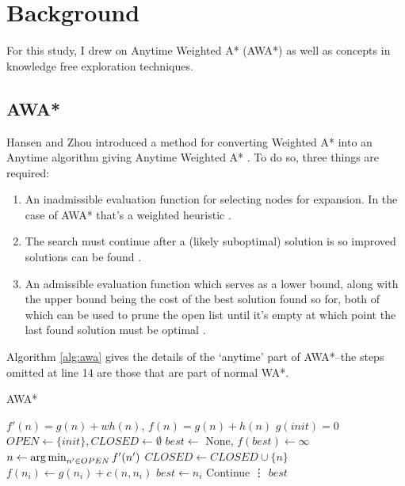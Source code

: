 \section{Background}
For this study, I drew on Anytime Weighted A* (AWA*) as well as concepts in knowledge free exploration techniques.

\subsection{AWA*}
Hansen and Zhou introduced a method for converting Weighted A* into an Anytime algorithm giving Anytime Weighted A* \cite{hansen2007anytime}. To do so, three things are required:

\begin{enumerate}
    \item An inadmissible evaluation function for selecting nodes for expansion. In the case of AWA* that's a weighted heuristic \cite{hansen2007anytime}.
    \item The search must continue after a (likely suboptimal) solution is so improved solutions can be found \cite{hansen2007anytime}.
    \item An admissible evaluation function which serves as a lower bound, along with the upper bound being the cost of the best solution found so for, both of which can be used to prune the open list until it's empty at which point the last found solution must be optimal \cite{hansen2007anytime}.
\end{enumerate}

Algorithm \ref{alg:awa} gives the details of the `anytime' part of AWA*--the steps omitted at line 14 are those that are part of normal WA*.

\begin{algorithm}
\caption{AWA*}\label{alg:awa}
\begin{algorithmic}[1]
\Require $f'(n)=g(n)+wh(n)$, $f(n)=g(n)+h(n)$
\State $g(init) = 0$
\State $OPEN \gets \{init\}, CLOSED \gets \emptyset$
\State $best \gets $ None, $f(best) \gets \infty$ 
    \State $n \gets \operatorname*{arg\,min}_{n' \in OPEN}f'(n')$
        \State $CLOSED \gets CLOSED \cup \{n\}$ 
                \State $f(n_i) \gets g(n_i)+c(n,n_i)$ 
                \State $best \gets n_i$  
                \State Continue
            \EndIf
            \State \vdots
        \EndFor
    \EndIf
\EndWhile
\State \Return $best$
\end{algorithmic}
\end{algorithm}

